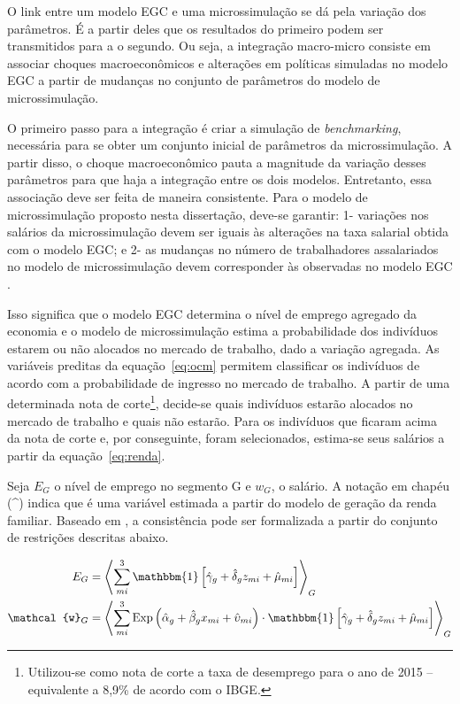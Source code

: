 O link entre um modelo EGC e uma microssimulação se dá pela variação dos parâmetros. É a partir deles que os resultados do primeiro podem ser transmitidos para a o segundo. Ou seja, a integração macro-micro consiste em associar choques macroeconômicos e alterações em políticas simuladas no modelo EGC a partir de mudanças no conjunto de parâmetros do modelo de microssimulação.

O primeiro passo para a integração é criar a simulação de \textit{benchmarking}, necessária para se obter um conjunto inicial de parâmetros da microssimulação. A partir disso, o choque macroeconômico pauta a magnitude da variação desses parâmetros para que haja a integração entre os dois modelos. Entretanto, essa associação deve ser feita de maneira consistente. Para o modelo de microssimulação proposto nesta dissertação, deve-se garantir: 1- variações nos salários da microssimulação devem ser iguais às alterações na taxa salarial obtida com o modelo EGC; e 2- as mudanças no número de trabalhadores assalariados no modelo de microssimulação devem corresponder às observadas no modelo EGC \cite{bourguignon05, colombo08}.

Isso significa que o modelo EGC determina o nível de emprego agregado da economia e o modelo de microssimulação estima a probabilidade dos indivíduos estarem ou não alocados no mercado de trabalho, dado a variação agregada. As variáveis preditas da equação~\eqref{eq:ocm} permitem classificar os indivíduos de acordo com a probabilidade de ingresso no mercado de trabalho. A partir de uma determinada nota de corte\footnote{Utilizou-se como nota de corte a taxa de desemprego para o ano de 2015 -- equivalente a 8,9\% de acordo com o IBGE.}, decide-se quais indivíduos estarão alocados no mercado de trabalho e quais não estarão. Para os indivíduos que ficaram acima da nota de corte e, por conseguinte, foram selecionados, estima-se seus salários a partir da equação~\eqref{eq:renda}.

Seja $E_G$ o nível de emprego no segmento G e $w_G$, o salário. A notação em chapéu (\^{}) indica que é uma variável estimada a partir do modelo de geração da renda familiar. Baseado em \textcite{bourguignon05}, a consistência pode ser formalizada a partir do conjunto de restrições descritas abaixo.

\begin{align}
	E_G &= \left\langle \sum_{mi}^{3} \mathbbm{1} \left[ \hat{\gamma}_g + \hat{\delta}_g z_{mi} + \hat{\mu}_{mi} \right] \right\rangle_{G} \label{eq:emprego_ag} \\
	\mathcal{w}_G &= \left\langle \sum_{mi}^{3} \text{Exp} \left( \hat{\alpha}_g + \hat{\beta}_g x_{mi} + \hat{\upsilon}_{mi} \right) \cdot \mathbbm{1} \left[ \hat{\gamma}_g + \hat{\delta}_g z_{mi} + \hat{\mu}_{mi} \right] \right\rangle_{G} \label{eq:renda_ag}
\end{align}

